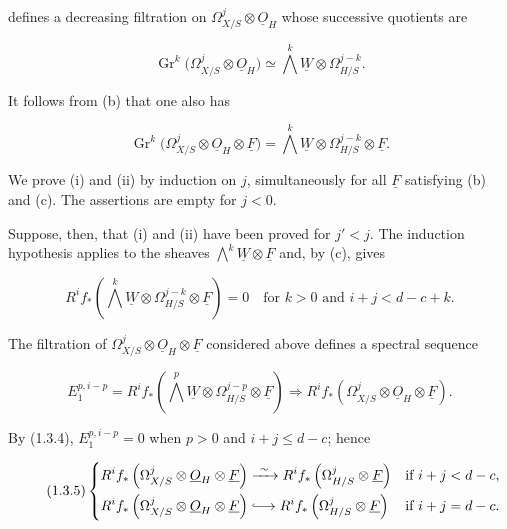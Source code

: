 defines a decreasing filtration on
$\Omega^j_{X/S}\otimes\underline O_H$ whose successive quotients are

\begin{equation}\tag{1.3.2}
\operatorname{Gr}^k\bigl(\Omega^j_{X/S}\otimes\underline O_H\bigr)
\simeq\bigwedge^k\underline W\otimes\Omega^{j-k}_{H/S}.
\end{equation}

It follows from (b) that one also has

\begin{equation}\tag{1.3.3}
\operatorname{Gr}^k\bigl(\Omega^j_{X/S}\otimes\underline O_H
\otimes\underline F\bigr)
=\bigwedge^k\underline W\otimes\Omega^{j-k}_{H/S}
\otimes\underline F.
\end{equation}

We prove (i) and (ii) by induction on $j$, simultaneously for all
$\underline F$ satisfying (b) and (c).  The assertions are empty for
$j<0$.


Suppose, then, that (i) and (ii) have been proved for $j'<j$.  The
induction hypothesis applies to the sheaves
$\bigwedge^k\underline W\otimes\underline F$ and, by (c), gives

\begin{equation}\tag{1.3.4}
R^if_*\left(\bigwedge^k\underline W\otimes
\Omega^{j-k}_{H/S}\otimes\underline F\right)=0
\quad\text{for }k>0\text{ and }i+j<d-c+k.
\end{equation}

The filtration of
$\Omega^j_{X/S}\otimes\underline O_H\otimes\underline F$ considered
above defines a spectral sequence

\begin{equation*}
E_1^{p,i-p}=R^if_*\left(\bigwedge^p\underline W\otimes
\Omega^{j-p}_{H/S}\otimes\underline F\right)
\Longrightarrow
R^if_*\left(\Omega^j_{X/S}\otimes\underline O_H
\otimes\underline F\right).
\end{equation*}

By (1.3.4), $E_1^{p,i-p}=0$ when $p>0$ and $i+j\leq d-c$; hence

\begin{equation}\tag{1.3.5}
\left\{
\begin{aligned}
R^if_*\left(\Omega^j_{X/S}\otimes\underline O_H\otimes\underline F\right)
&\xrightarrow{\ \sim\ }
R^if_*\left(\Omega^j_{H/S}\otimes\underline F\right)
&&\text{if }i+j<d-c,\\
R^if_*\left(\Omega^j_{X/S}\otimes\underline O_H\otimes\underline F\right)
&\lhook\joinrel\longrightarrow
R^if_*\left(\Omega^j_{H/S}\otimes\underline F\right)
&&\text{if }i+j=d-c.
\end{aligned}
\right.
\end{equation}

